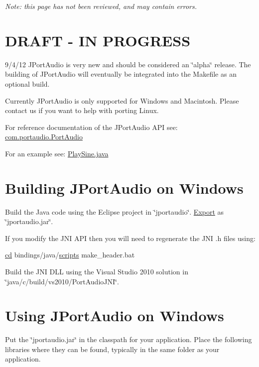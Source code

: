 {\itshape Note\+: this page has not been reviewed, and may contain errors.}\hypertarget{java_binding_java_draft}{}\section{D\+R\+A\+F\+T -\/ I\+N P\+R\+O\+G\+R\+E\+SS}\label{java_binding_java_draft}
9/4/12 J\+Port\+Audio is very new and should be considered an \char`\"{}alpha\char`\"{} release. The building of J\+Port\+Audio will eventually be integrated into the Makefile as an optional build.

Currently J\+Port\+Audio is only supported for Windows and Macintosh. Please contact us if you want to help with porting Linux.

For reference documentation of the J\+Port\+Audio A\+PI see\+: \hyperlink{classcom_1_1portaudio_1_1_port_audio}{com.\+portaudio.\+Port\+Audio}

For an example see\+: \hyperlink{_play_sine_8java}{Play\+Sine.\+java}\hypertarget{java_binding_java_comp_windows}{}\section{Building J\+Port\+Audio on Windows}\label{java_binding_java_comp_windows}
Build the Java code using the Eclipse project in \char`\"{}jportaudio\char`\"{}. \hyperlink{class_export}{Export} as \char`\"{}jportaudio.\+jar\char`\"{}.

If you modify the J\+NI A\+PI then you will need to regenerate the J\+NI .h files using\+:


\begin{DoxyCode}
\hyperlink{conv2dtest_8m_a51ec853512a386583838922288834695}{cd} bindings/java/\hyperlink{namespacesetup_ac1f45f8d37050b278bf63c812b1130dd}{scripts}
make\_header.bat
\end{DoxyCode}


Build the J\+NI D\+LL using the Visual Studio 2010 solution in \char`\"{}java/c/build/vs2010/\+Port\+Audio\+J\+N\+I\char`\"{}.\hypertarget{java_binding_java_use_windows}{}\section{Using J\+Port\+Audio on Windows}\label{java_binding_java_use_windows}
Put the \char`\"{}jportaudio.\+jar\char`\"{} in the classpath for your application. Place the following libraries where they can be found, typically in the same folder as your application.



